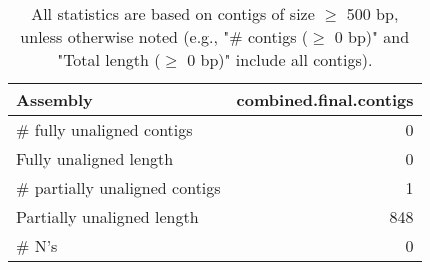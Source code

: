 \documentclass[12pt,a4paper]{article}
\begin{document}
\begin{table}[ht]
\begin{center}
\caption{All statistics are based on contigs of size $\geq$ 500 bp, unless otherwise noted (e.g., "\# contigs ($\geq$ 0 bp)" and "Total length ($\geq$ 0 bp)" include all contigs).}
\begin{tabular}{|l*{1}{|r}|}
\hline
Assembly & combined.final.contigs \\ \hline
\# fully unaligned contigs & 0 \\ \hline
Fully unaligned length & 0 \\ \hline
\# partially unaligned contigs & 1 \\ \hline
Partially unaligned length & 848 \\ \hline
\# N's & 0 \\ \hline
\end{tabular}
\end{center}
\end{table}
\end{document}
